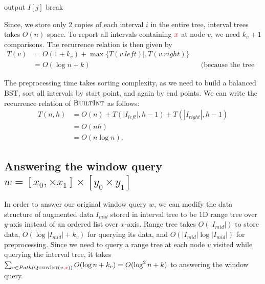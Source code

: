 \begin{algorithm}[H]
    \caption{} 
    \begin{algorithmic}[1]
              \State output $I[j]$
              \Else
                \State break 
            \EndIf
          \EndFor
        \EndFunction
     \end{algorithmic}
\end{algorithm}


Since, we store only 2 copies of each interval $i$ in the entire tree, interval trees takes $O(n)$ space.
%
To report all intervals containing $\textcolor{red}{x}$ at node $v$, we need $k_v +1 $ comparisons. The recurrence relation is then given by
\begin{align*} 
T(v) &= O(1 + k_v) + \max \{T(v.left)| , T(v.right) \}   \\
& = O(\log n + k) && \text{(because the tree is balanced).}
\end{align*}

The preprocessing time takes sorting complexity, as we need to build a balanced BST, sort all intervals by start point, and again by end points. 
%
We can write the recurrence relation of $\textsc{BuiltInt}$ as follows:
\begin{align*}
	T(n, h) &= O(n) + T(|I_{left}|, h-1) + T (|I_{right}|, h-1) \\
	& = O(nh) \\
	&= O(n \log n).  
\end{align*}

\subsection*{Answering the window query $w = [x_0, \times x_1] \times [y_0 \times y_1 ]$}
In order to answer our original window query $w$, we can modify the data structure of augmented data $I_{mid}$ stored in interval tree to be 1D range tree over $y$-axis instead of an ordered list over $x$-axis.
%
Range tree takes $O( |I_{mid}|)$ to store data, $O(\log |I_{mid}| + k_v)$ for querying its data, and $O(|I_{mid}| \log  |I_{mid}|)$ for preprocessing. Since we need to query a range tree at each node $v$ visited while querying the interval tree, it takes $ \sum_{v \in Path \left(\textsc{QueryInt}(v, \textcolor{red}{x} ) \right) } O(\log n + k_v) = O( \log^2 n + k)$ to answering the window query.